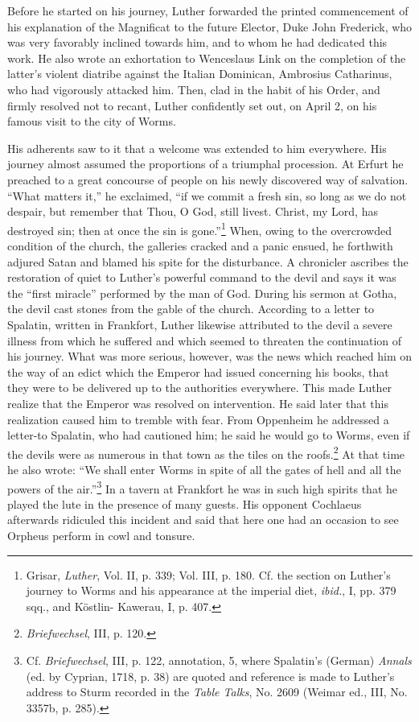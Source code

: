 Before he started on his journey, Luther forwarded the printed
commencement of his explanation of the Magnificat to the future
Elector, Duke John Frederick, who was very favorably inclined
towards him, and to whom
he had dedicated this work. He also wrote
an exhortation to Wenceslaus Link on the completion of the latter’s
violent diatribe against the Italian Dominican, Ambrosius Catharinus,
who had vigorously attacked him. Then, clad in the habit of his Order,
and firmly resolved not to recant, Luther confidently set out,
on April 2, on his famous visit to the city of Worms.

His adherents saw to it that a welcome was extended to him everywhere.
His journey almost assumed the proportions of a triumphal
procession. At Erfurt he preached to a great concourse of people on
his newly discovered way of salvation. “What matters it,” he exclaimed,
“if we commit a fresh sin, so long as we do not despair, but
remember that Thou, O God, still livest. Christ, my Lord, has destroyed
sin; then at once the sin is gone.”\footnote
{Grisar, \textit{Luther}, Vol. II, p. 339; Vol. III, p. 180. Cf. the section on Luther’s journey
to Worms and his appearance at the imperial diet, \textit{ibid.}, I, pp. 379 sqq., and Köstlin-
Kawerau, I, p. 407.}
When, owing to the overcrowded condition
of the church, the galleries cracked and a panic
ensued, he forthwith adjured Satan and blamed his spite for the disturbance.
A chronicler ascribes the restoration of quiet to Luther’s
powerful command to the devil and says it was the “first miracle”
performed by the man of God. During his sermon at Gotha, the
devil cast stones from the gable of the church. According to a letter
to Spalatin, written in Frankfort, Luther likewise attributed to the
devil a severe illness from which he suffered and which seemed to
threaten the continuation of his journey. What was more serious,
however, was the news which reached him on the way of an edict
which the Emperor had issued concerning his books, that they were to
be delivered up to the authorities everywhere. This made Luther realize
that the Emperor was resolved on intervention. He said later that
this realization caused him to tremble with fear. From Oppenheim
he addressed a letter-to Spalatin, who had cautioned him; he said he
would go to Worms, even if the devils were as numerous in that town
as the tiles on the roofs.\footnote{\textit{Briefwechsel}, III, p. 120.}
At that time he also wrote: “We shall enter
Worms in spite of all the gates of hell and all the powers of the
air.”\footnote
{Cf. \textit{Briefwechsel}, III, p. 122, annotation, 5, where Spalatin’s (German) \textit{Annals} (ed. by
Cyprian, 1718, p. 38) are quoted and reference is made to Luther’s address to Sturm recorded
in the \textit{Table Talks}, No. 2609 (Weimar ed., III, No. 3357b, p. 285).}
In a tavern at Frankfort he was in such high spirits that he
played the lute in the presence of many guests. His opponent Cochlaeus afterwards
ridiculed this incident and said that here one had an
occasion to see Orpheus perform in cowl and tonsure.


